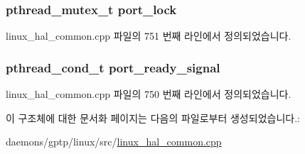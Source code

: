 \subsubsection[{\texorpdfstring{port\+\_\+lock}{port_lock}}]{\setlength{\rightskip}{0pt plus 5cm}pthread\+\_\+mutex\+\_\+t port\+\_\+lock}\hypertarget{struct_linux_condition_private_a487bd691e1e2e31c958ff8a1fbc72c9e}{}\label{struct_linux_condition_private_a487bd691e1e2e31c958ff8a1fbc72c9e}


linux\+\_\+hal\+\_\+common.\+cpp 파일의 751 번째 라인에서 정의되었습니다.

\subsubsection[{\texorpdfstring{port\+\_\+ready\+\_\+signal}{port_ready_signal}}]{\setlength{\rightskip}{0pt plus 5cm}pthread\+\_\+cond\+\_\+t port\+\_\+ready\+\_\+signal}\hypertarget{struct_linux_condition_private_a661b628f98aeac53e3761d30a8201add}{}\label{struct_linux_condition_private_a661b628f98aeac53e3761d30a8201add}


linux\+\_\+hal\+\_\+common.\+cpp 파일의 750 번째 라인에서 정의되었습니다.



이 구조체에 대한 문서화 페이지는 다음의 파일로부터 생성되었습니다.\+:\begin{DoxyCompactItemize}
\item 
daemons/gptp/linux/src/\hyperlink{linux__hal__common_8cpp}{linux\+\_\+hal\+\_\+common.\+cpp}\end{DoxyCompactItemize}
